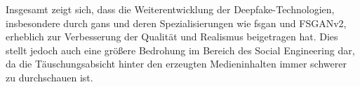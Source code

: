 Insgesamt zeigt sich, dass die Weiterentwicklung der Deepfake-Technologien, insbesondere durch \glspl{gan} und deren Spezialisierungen wie \gls{fsgan} und FSGANv2, erheblich zur Verbesserung der Qualität und Realismus beigetragen hat.
Dies stellt jedoch auch eine größere Bedrohung im Bereich des Social Engineering dar, da die Täuschungsabsicht hinter den erzeugten Medieninhalten immer schwerer zu durchschauen ist.

